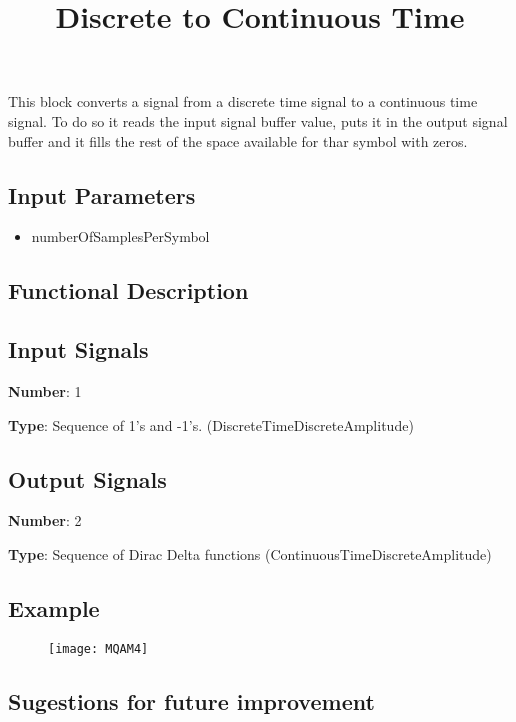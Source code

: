 \documentclass[a4paper]{article}
\title{Discrete to Continuous Time}
\begin{document}
\maketitle

This block converts a signal from a discrete time signal to a continuous time signal. To do so it reads the input signal buffer value, puts it in the output signal buffer and it fills the rest of the space available for thar symbol with zeros.

\subsection*{Input Parameters}

\begin{itemize}
	\item numberOfSamplesPerSymbol 
\end{itemize}

\subsection*{Functional Description}

\subsection*{Input Signals}

\textbf{Number}: 1

\textbf{Type}: Sequence of 1's and -1's. (DiscreteTimeDiscreteAmplitude)

\subsection*{Output Signals}

\textbf{Number}: 2

\textbf{Type}: Sequence of Dirac Delta functions (ContinuousTimeDiscreteAmplitude)

\subsection*{Example}

\begin{figure}[h]
	\texttt{[image: MQAM4]}
\end{figure}

\subsection*{Sugestions for future improvement}

\pagebreak
\end{document}
